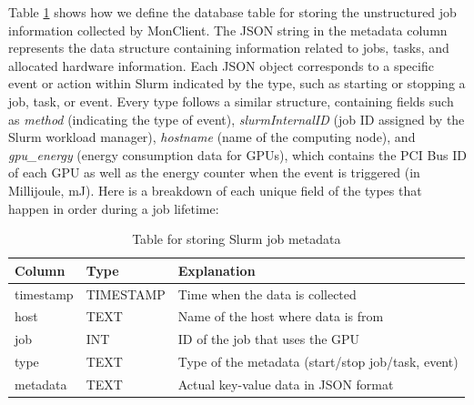 Table \ref{tab:slurm_job_metadata} shows how we define the database table for storing the unstructured job information collected by MonClient. The JSON string in the metadata column represents the data structure containing information related to jobs, tasks, and allocated hardware information. Each JSON object corresponds to a specific event or action within Slurm indicated by the type, such as starting or stopping a job, task, or event. Every type follows a similar structure, containing fields such as \textit{method} (indicating the type of event), \textit{slurmInternalID} (job ID assigned by the Slurm workload manager), \textit{hostname} (name of the computing node), and \textit{gpu\_energy} (energy consumption data for GPUs), which contains the PCI Bus ID of each GPU as well as the energy counter when the event is triggered (in Millijoule, mJ). Here is a breakdown of each unique field of the types that happen in order during a job lifetime:

\begin{table}[H]
    \centering
    \begin{tabular}{|l|l|l|}
        \hline
        Column & Type & Explanation \\
        \hline
        timestamp & TIMESTAMP & Time when the data is collected \\
        host & TEXT & Name of the host where data is from \\
        job & INT & ID of the job that uses the GPU \\
        type & TEXT &  Type of the metadata (start/stop job/task, event) \\
        metadata & TEXT & Actual key-value data in JSON format \\
        \hline
    \end{tabular}
    \caption{Table for storing Slurm job metadata}
    \label{tab:slurm_job_metadata}
\end{table}

